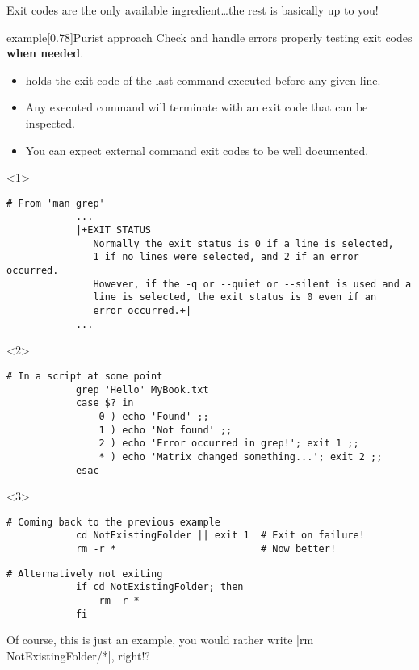 \begin{frame}[fragile]{Exit codes are the only available ingredient}{\ldots{}the rest is basically up to you!}
    \vspace{-3mm}
    {
        \large
        \begin{varblock}{example}[0.78\textwidth]{Purist approach}
            Check and handle errors properly testing exit codes \textbf{when needed}.
        \end{varblock}
    }
    \begin{itemize}
        \item {} holds the exit code of the last command executed before any given line.
        \item Any executed command will terminate with an exit code that can be inspected.
        \item You can expect external command exit codes to be well documented.
    \end{itemize}
    \begin{onlyenv}<1>
        \begin{lstlisting}[style=myBash, numbers=none, aboveskip=4mm]
            # From 'man grep'
            ...
            |+EXIT STATUS
               Normally the exit status is 0 if a line is selected,
               1 if no lines were selected, and 2 if an error occurred.
               However, if the -q or --quiet or --silent is used and a
               line is selected, the exit status is 0 even if an
               error occurred.+|
            ...
        \end{lstlisting}
    \end{onlyenv}
    \begin{onlyenv}<2>
        \begin{lstlisting}[style=myBash, numbers=none, aboveskip=4mm]
            # In a script at some point
            grep 'Hello' MyBook.txt
            case $? in
                0 ) echo 'Found' ;;
                1 ) echo 'Not found' ;;
                2 ) echo 'Error occurred in grep!'; exit 1 ;;
                * ) echo 'Matrix changed something...'; exit 2 ;;
            esac
        \end{lstlisting}
    \end{onlyenv}
    \begin{onlyenv}<3>
        \begin{lstlisting}[style=myBash, numbers=none, aboveskip=4mm]
            # Coming back to the previous example
            cd NotExistingFolder || exit 1  # Exit on failure!
            rm -r *                         # Now better!
        \end{lstlisting}
        \begin{lstlisting}[style=myBash, numbers=none, aboveskip=2mm, belowskip=-6mm]
            # Alternatively not exiting
            if cd NotExistingFolder; then
                rm -r *
            fi
        \end{lstlisting}
        \centerline{\tiny Of course, this is just an example, you would rather write \;\bash|rm NotExistingFolder/*|\;, right!?}
    \end{onlyenv}
\end{frame}
